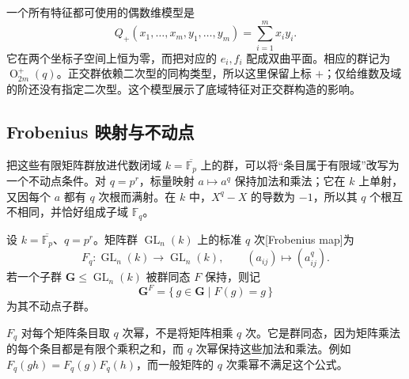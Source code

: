\ProseParagraphBreak

一个所有特征都可使用的偶数维模型是
\[
	Q_+(x_1,\ldots,x_m,y_1,\ldots,y_m)=\sum_{i=1}^m x_i y_i.
\]
它在两个坐标子空间上恒为零，而把对应的 \(e_i,f_i\) 配成双曲平面。相应的群记为 \(\operatorname O^+_{2m}(q)\)。正交群依赖二次型的同构类型，所以这里保留上标 \(+\)；仅给维数及域的阶还没有指定二次型。这个模型展示了底域特征对正交群构造的影响。

\subsection{Frobenius 映射与不动点}
\label{b5:subsec:F01:02}

把这些有限矩阵群放进代数闭域 \(k=\overline{\mathbb F_p}\) 上的群，可以将“条目属于有限域”改写为一个不动点条件。对 \(q=p^r\)，标量映射 \(a\mapsto a^q\) 保持加法和乘法；它在 \(k\) 上单射，又因每个 \(a\) 都有 \(q\) 次根而满射。在 \(k\) 中，\(X^q-X\) 的导数为 \(-1\)，所以其 \(q\) 个根互不相同，并恰好组成子域 \(\mathbb F_q\)。

\begin{definition}\label{b5:def:F-matrix-frobenius}
	设 \(k=\overline{\mathbb F_p}\)、\(q=p^r\)。矩阵群 \(\operatorname{GL}_n(k)\) 上的标准 \(q\) 次[Frobenius map]为
	\[
		F_q:\operatorname{GL}_n(k)\longrightarrow\operatorname{GL}_n(k),\qquad
		(a_{ij})\longmapsto(a_{ij}^{q}).
	\]
	若一个子群 \(\mathbf G\le\operatorname{GL}_n(k)\) 被群同态 \(F\) 保持，则记
	\[
		\mathbf G^F=\{\,g\in\mathbf G\mid F(g)=g\,\}
	\]
	为其不动点子群。
\end{definition}
\(F_q\) 对每个矩阵条目取 \(q\) 次幂，不是将矩阵相乘 \(q\) 次。它是群同态，因为矩阵乘法的每个条目都是有限个乘积之和，而 \(q\) 次幂保持这些加法和乘法。例如 \(F_q(gh)=F_q(g)F_q(h)\)，而一般矩阵的 \(q\) 次乘幂不满足这个公式。

